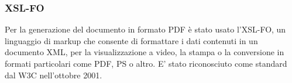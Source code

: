 \subsubsection{XSL-FO}
Per la generazione del documento in formato PDF è stato usato l'XSL-FO, un linguaggio di markup che consente di formattare i dati contenuti in un documento XML, per la visualizzazione a video, la stampa o la conversione in formati particolari come PDF, PS o altro. E' stato riconosciuto come standard dal W3C nell'ottobre 2001.


